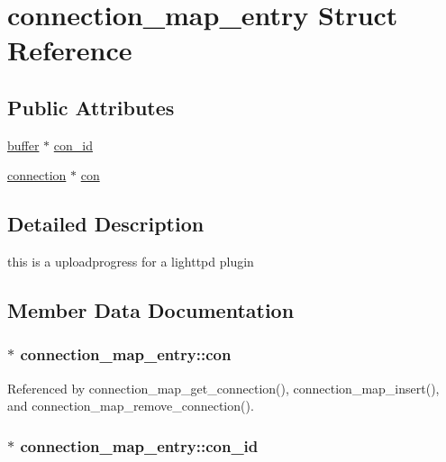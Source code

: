 \hypertarget{structconnection__map__entry}{\section{connection\-\_\-map\-\_\-entry Struct Reference}
\label{structconnection__map__entry}
}
\subsection*{Public Attributes}
\begin{DoxyCompactItemize}
\item 
\hyperlink{structbuffer}{buffer} $\ast$ \hyperlink{structconnection__map__entry_af5ec3440f3c825fc520b246209042719}{con\-\_\-id}
\item 
\hyperlink{structconnection}{connection} $\ast$ \hyperlink{structconnection__map__entry_a32512220136d43a40f2219f87b9689ee}{con}
\end{DoxyCompactItemize}


\subsection{Detailed Description}
this is a uploadprogress for a lighttpd plugin 

\subsection{Member Data Documentation}
\hypertarget{structconnection__map__entry_a32512220136d43a40f2219f87b9689ee}{
\subsubsection[{con}]{$\ast$ connection\-\_\-map\-\_\-entry\-::con}}\label{structconnection__map__entry_a32512220136d43a40f2219f87b9689ee}


Referenced by connection\-\_\-map\-\_\-get\-\_\-connection(), connection\-\_\-map\-\_\-insert(), and connection\-\_\-map\-\_\-remove\-\_\-connection().

\hypertarget{structconnection__map__entry_af5ec3440f3c825fc520b246209042719}{
\subsubsection[{con\-\_\-id}]{$\ast$ connection\-\_\-map\-\_\-entry\-::con\-\_\-id}}\label{structconnection__map__entry_af5ec3440f3c825fc520b246209042719}


